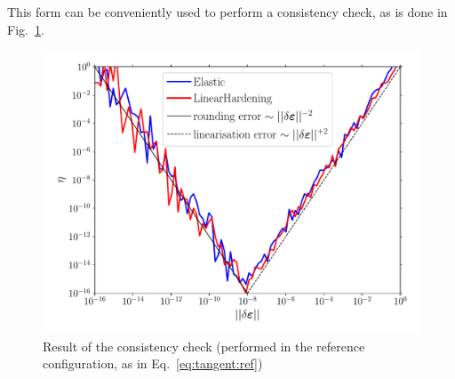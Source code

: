 \documentclass[garamond]{goose-article}
\begin{document}
This form can be conveniently used to perform a consistency check, as is done in Fig.~\ref{fig:consistency}.

\begin{figure}[htp]
  \centering
  \includegraphics[width=.5\textwidth]{examples/consistency}
  \caption{Result of the consistency check (performed in the reference configuration, as in Eq.~\eqref{eq:tangent:ref})}
  \label{fig:consistency}
\end{figure}


\end{document}
